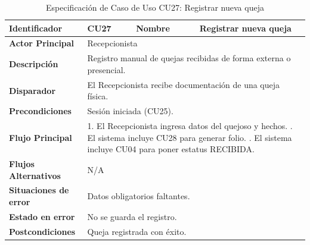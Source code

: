 \begingroup
\setlength{\parskip}{0pt}
\begin{longtable}{|p{3.5cm}|p{2cm}|p{2.5cm}|p{7cm}|}
\caption{Especificación de Caso de Uso CU27: Registrar nueva queja}
\label{tab:cu27} \\
\hline
\textbf{Identificador} & CU27 & \textbf{Nombre} & Registrar nueva queja \\ \hline
\textbf{Actor Principal} & \multicolumn{3}{p{11.5cm}|}{Recepcionista} \\ \hline
\textbf{Descripción} & \multicolumn{3}{p{11.5cm}|}{Registro manual de quejas recibidas de forma externa o presencial.} \\ \hline
\textbf{Disparador} & \multicolumn{3}{p{11.5cm}|}{El Recepcionista recibe documentación de una queja física.} \\ \hline
\textbf{Precondiciones} & \multicolumn{3}{p{11.5cm}|}{Sesión iniciada (CU25).} \\ \hline
\textbf{Flujo Principal} & \multicolumn{3}{p{11.5cm}|}{1. El Recepcionista ingresa datos del quejoso y hechos. \newline 2. El sistema incluye CU28 para generar folio. \newline 3. El sistema incluye CU04 para poner estatus RECIBIDA.} \\ \hline
\textbf{Flujos Alternativos} & \multicolumn{3}{p{11.5cm}|}{N/A} \\ \hline
\textbf{Situaciones de error} & \multicolumn{3}{p{11.5cm}|}{Datos obligatorios faltantes.} \\ \hline
\textbf{Estado en error} & \multicolumn{3}{p{11.5cm}|}{No se guarda el registro.} \\ \hline
\textbf{Postcondiciones} & \multicolumn{3}{p{11.5cm}|}{Queja registrada con éxito.} \\ \hline
\end{longtable}
\endgroup

\vspace{0.8cm}

